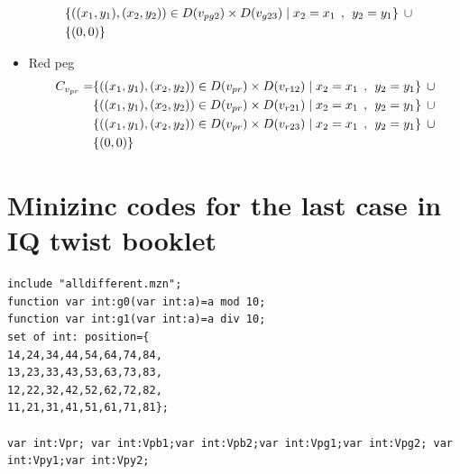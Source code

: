 \begin{appendices}
\begin{itemize}
\begin{align*}
\\&\{ ((x_{1},y_{1}),(x_{2},y_{2}))\in D(v_{pg2}) \times D(v_{g23})\mid x_{2} = x_{1} \hspace{1ex} , \hspace{1ex}  y_{2} = y_{1}\} \hspace{1ex} \cup 
\\&\{(0,0)\}
\end{align*}
  \item Red peg
  \begin{align*}
C_{v_{pr}} = &\{((x_{1},y_{1}),(x_{2},y_{2}))\in D(v_{pr}) \times D(v_{r12})\mid x_{2} = x_{1} \hspace{1ex} , \hspace{1ex}  y_{2} = y_{1}\} \hspace{1ex} \cup 
\\&\{((x_{1},y_{1}),(x_{2},y_{2}))\in D(v_{pr}) \times D(v_{r21})\mid x_{2} = x_{1} \hspace{1ex} , \hspace{1ex}  y_{2} = y_{1}\} \hspace{1ex} \cup 
\\&\{ ((x_{1},y_{1}),(x_{2},y_{2}))\in D(v_{pr}) \times D(v_{r23})\mid x_{2} = x_{1} \hspace{1ex} , \hspace{1ex}  y_{2} = y_{1}\}\hspace{1ex} \cup 
\\& \{(0,0)\}
\end{align*}
\end{itemize}
\section{Minizinc codes for the last case in IQ twist booklet}
\label{appendix:finalcaseIQtwist}
\begin{lstlisting}[language=minizinc]
include "alldifferent.mzn";
function var int:g0(var int:a)=a mod 10;
function var int:g1(var int:a)=a div 10;
set of int: position={
14,24,34,44,54,64,74,84,
13,23,33,43,53,63,73,83,
12,22,32,42,52,62,72,82,
11,21,31,41,51,61,71,81};

var int:Vpr; var int:Vpb1;var int:Vpb2;var int:Vpg1;var int:Vpg2; var int:Vpy1;var int:Vpy2;


\end{lstlisting}
\end{appendices}
